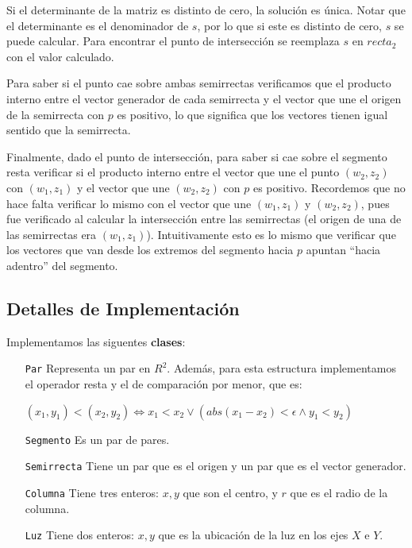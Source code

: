 Si el determinante de la matriz es distinto de cero, la solución es única. Notar
que el determinante es el denominador de $s$, por lo que si este es distinto de
cero, $s$ se puede calcular. Para encontrar el punto de intersección se reemplaza
$s$ en $recta_2$ con el valor calculado.

Para saber si el punto cae sobre ambas semirrectas verificamos que el producto
interno entre el vector generador de cada semirrecta y el vector que une el
origen de la semirrecta con $p$ es positivo, lo que significa que los vectores
tienen igual sentido que la semirrecta.

Finalmente, dado el punto de intersección, para saber si cae sobre el
segmento resta verificar si el producto interno entre el vector que une el
punto $(w_2, z_2)$ con $(w_1, z_1)$ y el vector que une $(w_2, z_2)$ con $p$
es positivo. Recordemos que no hace falta verificar lo mismo con el vector
que une $(w_1, z_1)$ y $(w_2, z_2)$, pues fue verificado al calcular la
intersección entre las semirrectas (el origen de una de las semirrectas era
$(w_1, z_1)$). Intuitivamente esto es lo mismo que verificar que los vectores
que van desde los extremos del segmento hacia $p$ apuntan ``hacia adentro''
del segmento.


\subsection*{Detalles de Implementación}

Implementamos las siguentes {\bf clases}:

\begin{itemize}
\item[\tt\small Par] Representa un par en $R^2$. Además, para esta
estructura implementamos el operador resta y el de comparación por menor, que es:

$(x_1, y_1) < (x_2, y_2) \Leftrightarrow x_1 < x_2 \vee ( abs(x_1 - x_2) < \epsilon \wedge y_1 < y_2 )$

\item[\tt\small Segmento] Es un par de pares.

\item[\tt\small Semirrecta] Tiene un par que es el origen y un par que es el vector generador.

\item[\tt\small Columna] Tiene tres enteros: $x,y$ que son el centro, y $r$ que es el radio de la columna.

\item[\tt\small Luz] Tiene dos enteros: $x,y$ que es la ubicación de la luz en los ejes $X$ e $Y$.
\end{itemize}

